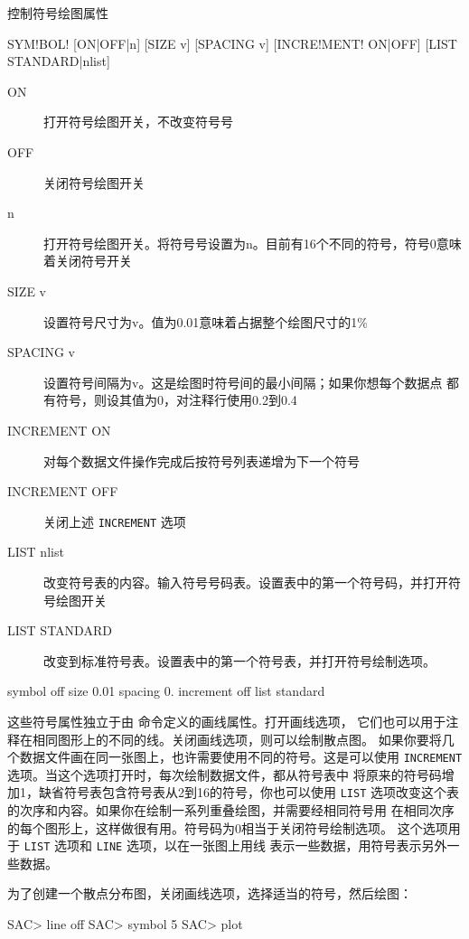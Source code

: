 \label{cmd:symbol}

控制符号绘图属性

\begin{SACSTX}
SYM!BOL! [ON|OFF|n] [SIZE v] [SPACING v] [INCRE!MENT! ON|OFF] [LIST STANDARD|nlist]
\end{SACSTX}

\begin{description}
\item [ON] 打开符号绘图开关，不改变符号号
\item [OFF] 关闭符号绘图开关
\item [n] 打开符号绘图开关。将符号号设置为n。目前有16个不同的符号，符号0意味着关闭符号开关
\item [SIZE v] 设置符号尺寸为v。值为0.01意味着占据整个绘图尺寸的1\%
\item [SPACING v] 设置符号间隔为v。这是绘图时符号间的最小间隔；如果你想每个数据点
    都有符号，则设其值为0，对注释行使用0.2到0.4
\item [INCREMENT ON] 对每个数据文件操作完成后按符号列表递增为下一个符号
\item [INCREMENT OFF] 关闭上述 \texttt{INCREMENT} 选项
\item [LIST nlist] 改变符号表的内容。输入符号号码表。设置表中的第一个符号码，并打开符号绘图开关
\item [LIST STANDARD] 改变到标准符号表。设置表中的第一个符号表，并打开符号绘制选项。
\end{description}

\begin{SACDFT}
symbol off size 0.01 spacing 0. increment off list standard
\end{SACDFT}

这些符号属性独立于由  命令定义的画线属性。打开画线选项，
它们也可以用于注释在相同图形上的不同的线。关闭画线选项，则可以绘制散点图。
如果你要将几个数据文件画在同一张图上，也许需要使用不同的符号。这是可以使用
\texttt{INCREMENT} 选项。当这个选项打开时，每次绘制数据文件，都从符号表中
将原来的符号码增加1，缺省符号表包含符号表从2到16的符号，你也可以使用 \texttt{LIST}
选项改变这个表的次序和内容。如果你在绘制一系列重叠绘图，并需要经相同符号用
在相同次序的每个图形上，这样做很有用。符号码为0相当于关闭符号绘制选项。
这个选项用于 \texttt{LIST} 选项和 \texttt{LINE} 选项，以在一张图上用线
表示一些数据，用符号表示另外一些数据。

为了创建一个散点分布图，关闭画线选项，选择适当的符号，然后绘图：
\begin{SACCode}
SAC> line off
SAC> symbol 5
SAC> plot
\end{SACCode}

